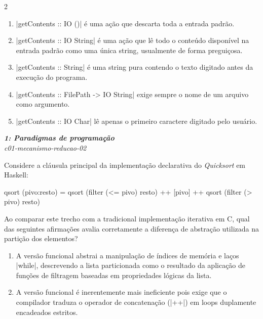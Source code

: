 \documentclass[a4paper,10pt,brazil]{article}
\begin{document}
\begin{multicols}{2}
\begin{enumerate}
  \item \haskellinline|getContents :: IO ()| é uma ação que descarta toda a entrada padrão.

  \item \haskellinline|getContents :: IO String| é uma ação que lê todo o conteúdo disponível na entrada padrão como uma única string, usualmente de forma preguiçosa.

  \item \haskellinline|getContents :: String| é uma string pura contendo o texto digitado antes da execução do programa.

  \item \haskellinline|getContents :: FilePath -> IO String| exige sempre o nome de um arquivo como argumento.

  \item \haskellinline|getContents :: IO Char| lê apenas o primeiro caractere digitado pelo usuário.


\end{enumerate}

\begin{flushright}
  \footnotesize
  \textit{\textbf{1: Paradigmas de programação}}\\
  \textit{c01-mecanismo-reducao-02}\\

\end{flushright}
Considere a cláusula principal da implementação declarativa do \emph{Quicksort} em Haskell:

\begin{haskellcode}
qsort (pivo:resto) = qsort (filter (<= pivo) resto) ++ 
                     [pivo] ++ 
                     qsort (filter (> pivo) resto)
\end{haskellcode}

Ao comparar este trecho com a tradicional implementação iterativa em C, qual das seguintes afirmações avalia corretamente a diferença de abstração utilizada na partição dos elementos?

\begin{enumerate}
  \item A versão funcional abstrai a manipulação de índices de memória e laços \cinline|while|, descrevendo a lista particionada como o resultado da aplicação de funções de filtragem baseadas em propriedades lógicas da lista.

  \item A versão funcional é inerentemente mais ineficiente pois exige que o compilador traduza o operador de concatenação (\haskellinline|++|) em loops duplamente encadeados estritos.


\end{enumerate}
\end{multicols}
\end{document}

